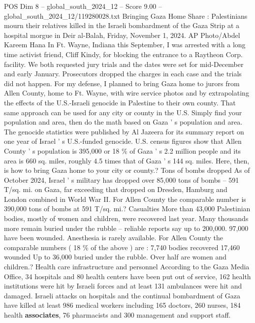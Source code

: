 \begin{textsample}{POS Dim 8 – global\_south\_2024\_12 – Score 9.00 – global\_south\_2024\_12/119280028.txt}  \label{ex:f8_pos_065}
Bringing Gaza Home Share : Palestinians mourn their relatives killed in the Israeli bombardment of the Gaza Strip at a hospital morgue in Deir al-Balah, Friday, November 1, 2024.
AP Photo/Abdel Kareem Hana In Ft.
Wayne, Indiana this September, I was arrested with a long time activist friend, Cliff Kindy, for blocking the entrance to a Raytheon Corp. facility.
We both requested jury trials and the dates were set for mid-December and early January.
Prosecutors dropped the charges in each case and the trials did not happen.
For my defense, I planned to bring Gaza home to jurors from Allen County, home to Ft.
Wayne, with wire service photos and by extrapolating the effects of the U.S.-Israeli genocide in Palestine to their own county.
That same approach can be used for any city or county in the U.S.
Simply find your population and area, then do the math based on Gaza ' s population and area.
The genocide statistics were published by Al Jazeera for its summary report on one year of Israel ' s U.S.-funded genocide.
U.S. census figures show that Allen County ' s population is 395,000 or 18 \% of Gaza ' s 2.2 million people and its area is 660 sq. miles, roughly 4.5 times that of Gaza ' s 144 sq. miles.
Here, then, is how to bring Gaza home to your city or county.?
Tons of bombs dropped As of October 2024, Israel ' s military has dropped over 85,000 tons of bombs -- 591 T/sq. mi. on Gaza, far exceeding that dropped on Dresden, Hamburg and London combined in World War II.
For Allen County the comparable number is 390,000 tons of bombs at 591 T/sq. mi.?
Casualties More than 43,000 Palestinian bodies, mostly of women and children, were recovered last year.
Many thousands more remain buried under the rubble -- reliable reports say up to 200,000. 97,000 have been wounded.
Anesthesia is rarely available.
For Allen County the comparable numbers ( 18 \% of the above ) are : 7,740 bodies recovered 17,460 wounded Up to 36,000 buried under the rubble.
Over half are women and children.?
Health care infrastructure and personnel According to the Gaza Media Office, 34 hospitals and 80 health centers have been put out of service, 162 health institutions were hit by Israeli forces and at least 131 ambulances were hit and damaged.
Israeli attacks on hospitals and the continual bombardment of Gaza have killed at least 986 medical workers including 165 doctors, 260 nurses, 184 health \textbf{associates}, 76 pharmacists and 300 management and support staff.

\end{textsample}
